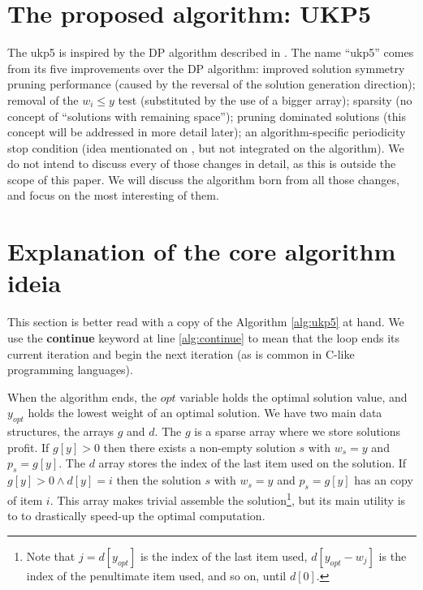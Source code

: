 \documentclass[runningheads,a4paper]{llncs}
\begin{document}
\section{The proposed algorithm: UKP5}

The ukp5 is inspired by the DP algorithm described in \cite[p. 221]{CGAR}. The name ``ukp5'' comes from its five improvements over the \cite{CGAR} DP algorithm: improved solution symmetry pruning performance (caused by the reversal of the solution generation direction); removal of the \(w_i \leq y\) test (substituted by the use of a bigger array); sparsity (no concept of ``solutions with remaining space''); pruning dominated solutions (this concept will be addressed in more detail later); an algorithm-specific periodicity stop condition (idea mentionated on \cite{CGAR}, but not integrated on the algorithm). We do not intend to discuss every of those changes in detail, as this is outside the scope of this paper. We will discuss the algorithm born from all those changes, and focus on the most interesting of them.

\section{Explanation of the core algorithm ideia}

This section is better read with a copy of the Algorithm \ref{alg:ukp5} at hand. We use the \textbf{continue} keyword at line \ref{alg:continue} to mean that the loop ends its current iteration and begin the next iteration (as is common in C-like programming languages).

When the algorithm ends, the \(opt\) variable holds the optimal solution value, and \(y_{opt}\) holds the lowest weight of an optimal solution. We have two main data structures, the arrays \(g\) and \(d\). The \(g\) is a sparse array where we store solutions profit. If \(g[y] > 0\) then there exists a non-empty solution \(s\) with \(w_s = y\) and \(p_s = g[y]\). The \(d\) array stores the index of the last item used on the solution. If \(g[y] > 0 \land d[y] = i\) then the solution \(s\) with \(w_s = y\) and \(p_s = g[y]\) has an copy of item \(i\). This array makes trivial assemble the solution\footnote{Note that \(j = d[y_{opt}]\) is the index of the last item used, \(d[y_{opt} - w_j]\) is the index of the penultimate item used, and so on, until \(d[0]\).}, but its main utility is to to drastically speed-up the optimal computation.
\end{document}
